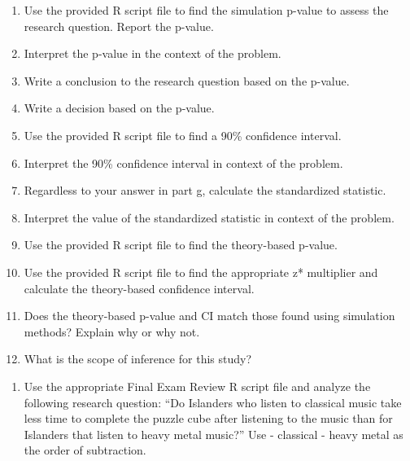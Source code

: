 \documentclass[
]{report}
\providecommand{\tightlist}{%
  \setlength{\itemsep}{0pt}\setlength{\parskip}{0pt}}
\begin{document}
\vspace{0.8in}

\begin{enumerate}
\def\labelenumi{\alph{enumi}.}
\setcounter{enumi}{7}
\item
  Use the provided R script file to find the simulation p-value to assess the research question. Report the p-value.
  \vspace{0.3in}
\item
  Interpret the p-value in the context of the problem.
  \vspace{0.8in}
\item
  Write a conclusion to the research question based on the p-value.
  \vspace{0.8in}
\item
  Write a decision based on the p-value.
  \vspace{0.3in}
\item
  Use the provided R script file to find a 90\% confidence interval.
  \vspace{0.3in}
\item
  Interpret the 90\% confidence interval in context of the problem.
  \vspace{0.8in}
\item
  Regardless to your answer in part g, calculate the standardized statistic.
  \vspace{0.4in}
\item
  Interpret the value of the standardized statistic in context of the problem.
  \vspace{0.8in}
\item
  Use the provided R script file to find the theory-based p-value.
  \vspace{0.3in}
\item
  Use the provided R script file to find the appropriate z* multiplier and calculate the theory-based confidence interval.
  \vspace{0.5in}
\item
  Does the theory-based p-value and CI match those found using simulation methods? Explain why or why not.
  \vspace{0.8in}
\item
  What is the scope of inference for this study?
  \vspace{0.8in}
\end{enumerate}

\begin{enumerate}
\def\labelenumi{\arabic{enumi}.}
\setcounter{enumi}{1}
\tightlist
\item
  Use the appropriate Final Exam Review R script file and analyze the following research question: ``Do Islanders who listen to classical music take less time to complete the puzzle cube after listening to the music than for Islanders that listen to heavy metal music?'' Use - classical - heavy metal as the order of subtraction.
\end{enumerate}
\end{document}

